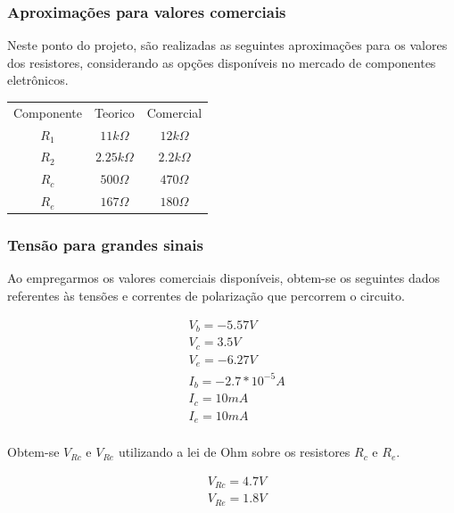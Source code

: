 \subsubsection{Aproximações para valores comerciais}

Neste ponto do projeto, são realizadas as seguintes aproximações para os valores dos resistores, considerando as opções disponíveis no mercado de componentes eletrônicos.

\begin{center}
    \begin{tabular}{ |c|c|c| }
        \hline
        Componente & Teorico            & Comercial        \\
        $R_1$      & $11k \varOmega$    & $12k \varOmega$  \\
        $R_2$      & $2.25 k \varOmega$ & $2.2k \varOmega$ \\
        $R_c$      & $500 \varOmega$    & $470 \varOmega$  \\
        $R_e$      & $167 \varOmega$    & $180 \varOmega$  \\
        \hline
    \end{tabular}
\end{center}

\subsubsection{Tensão para grandes sinais}

Ao empregarmos os valores comerciais disponíveis, obtem-se os seguintes dados referentes às tensões e correntes de polarização que percorrem o circuito.


\begin{equation}
    \begin{aligned}
         & V_b = -5.57 V         \\
         & V_c = 3.5 V           \\
         & V_e = -6.27 V         \\
         & I_b = -2.7* 10^{-5} A \\
         & I_c = 10 mA           \\
         & I_e = 10 mA           \\
    \end{aligned}
\end{equation}

Obtem-se $V_{Rc}$ e $V_{Re}$ utilizando a lei de Ohm sobre os resistores $R_c$ e $R_e$.

\begin{equation}
    \begin{aligned}
         & V_{Rc} = 4.7 V \\
         & V_{Re} = 1.8 V
    \end{aligned}
\end{equation}


